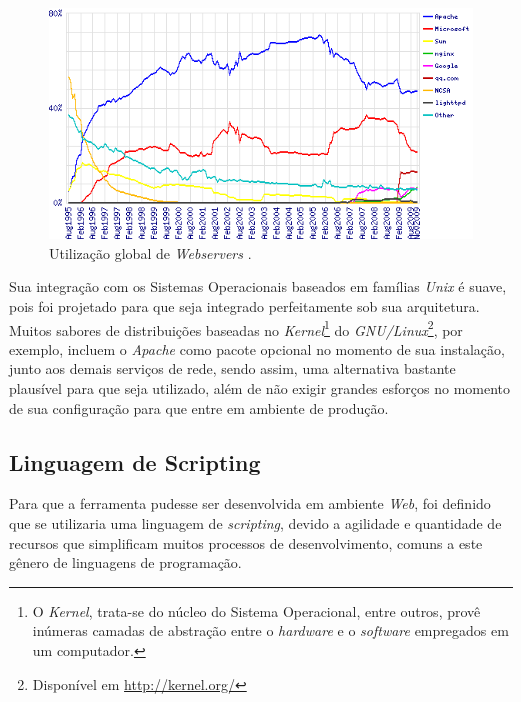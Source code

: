 \begin{figure}[h]
    \begin{center}
        \includegraphics[scale=0.8]{./figuras/overallc.png}

        \caption{Utilização global de \textit{Webservers} \cite{Netcraft}.}
    \end{center}
\end{figure}

Sua integração com os Sistemas Operacionais baseados em famílias \textit{Unix} é suave, pois foi projetado para que seja integrado perfeitamente sob sua arquitetura. Muitos sabores de distribuições baseadas no \textit{Kernel}\footnote{O \textit{Kernel}, trata-se do núcleo do Sistema Operacional, entre outros, provê inúmeras camadas de abstração entre o \textit{hardware} e o \textit{software} empregados em um computador.} do \textit{GNU/Linux}\footnote{Disponível em \url{http://kernel.org/}}, por exemplo, incluem o \textit{Apache} como pacote opcional no momento de sua instalação, junto aos demais serviços de rede, sendo assim, uma alternativa bastante plausível para que seja utilizado, além de não exigir grandes esforços no momento de sua configuração para que entre em ambiente de produção.

\subsection{Linguagem de Scripting}

Para que a ferramenta pudesse ser desenvolvida em ambiente \textit{Web}, foi definido que se utilizaria uma linguagem de \textit{scripting}, devido a agilidade e quantidade de recursos que simplificam muitos processos de desenvolvimento, comuns a este gênero de linguagens de programação.

